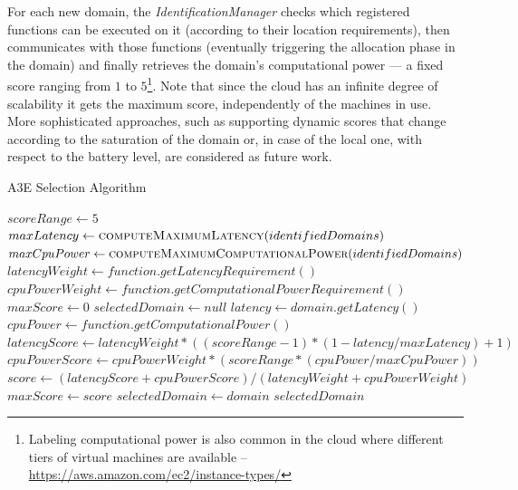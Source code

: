 For each new domain, the \textit{IdentificationManager} checks which registered functions can be executed on it (according to their location requirements), then communicates with those functions (eventually triggering the allocation phase in the domain) and finally retrieves the domain's computational power --- a fixed score ranging from $1$ to $5$\footnote{Labeling computational power is also common in the cloud where different tiers of virtual machines are available -- \url{https://aws.amazon.com/ec2/instance-types/}}. %
Note that since the cloud has an infinite degree of scalability it gets the maximum score, independently of the machines in use. More sophisticated approaches, such as supporting dynamic scores that change according to the saturation of the domain or, in case of the local one, with respect to the battery level, are considered as future work.  

\begin{algorithm}[b]
	\caption{A3E Selection Algorithm}
	\label{alg:selection}
	\begin{algorithmic}[1]
		
		\State$scoreRange \gets 5$
		\State $maxLatency \gets \Call{computeMaximumLatency}{identifiedDomains}$
		\State $maxCpuPower \gets \Call{computeMaximumComputationalPower}{identifiedDomains}$
		\State $latencyWeight \gets function.getLatencyRequirement()$ 
		\State $cpuPowerWeight \gets function.getComputationalPowerRequirement()$ 
		\State $maxScore \gets 0$
		\State $selectedDomain \gets null$
		\State $latency \gets domain.getLatency()$ 
		\State $cpuPower \gets function.getComputationalPower()$ 
		\State $latencyScore \gets latencyWeight*((scoreRange-1)*(1 - latency/maxLatency)+1)$ 
		\State $cpuPowerScore \gets cpuPowerWeight*(scoreRange*(cpuPower/maxCpuPower))$
		\State $score \gets (latencyScore + cpuPowerScore) / (latencyWeight + cpuPowerWeight)$
		\State $maxScore \gets score$
		\State $selectedDomain \gets domain$
		\EndIf
		\EndFor 
		\State \Return $selectedDomain$
		\EndFunction
	\end{algorithmic}
\end{algorithm}

